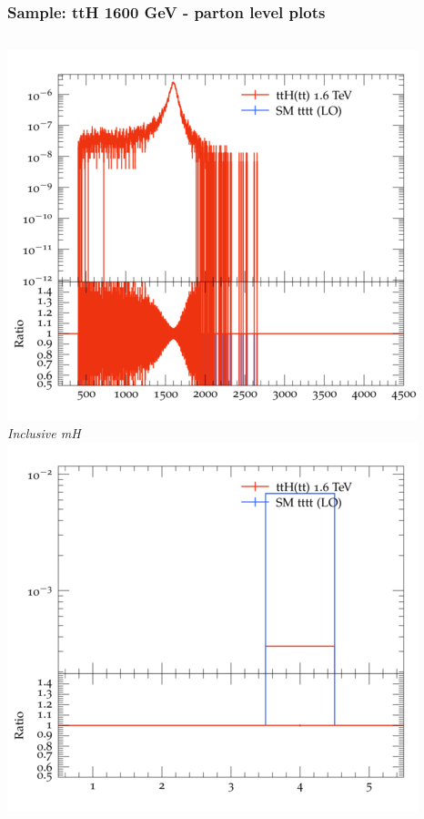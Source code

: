 \documentclass{beamer}
\begin{document}
\begin{frame}
\frametitle{Sample: ttH 1600 GeV - parton level plots}
\begin{columns}
\includegraphics[width=\textwidth]{../plots/ttH_1600/tttt_ttH/Inclusive_mH.png}\\
\textit{\small Inclusive mH}
\includegraphics[width=\textwidth]{../plots/ttH_1600/tttt_ttH/Inclusive_nTop.png}\\

\end{columns}
\end{frame}
\end{document}

